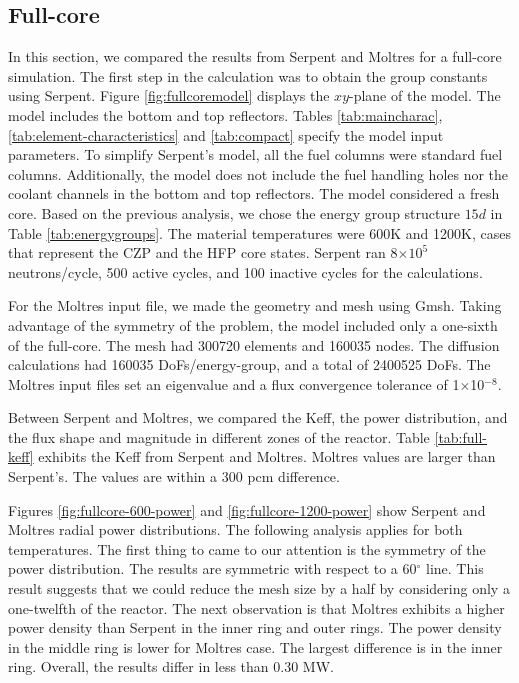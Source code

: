 \documentclass[11pt,letterpaper]{article}
\begin{document}
\subsection{Full-core}

In this section, we compared the results from Serpent and Moltres for a full-core simulation.
The first step in the calculation was to obtain the group constants using Serpent.
Figure \ref{fig:fullcoremodel} displays the $xy$-plane of the model.
The model includes the bottom and top reflectors.
Tables \ref{tab:maincharac}, \ref{tab:element-characteristics} and \ref{tab:compact} specify the model input parameters.
To simplify Serpent's model, all the fuel columns were standard fuel columns.
Additionally, the model does not include the fuel handling holes nor the coolant channels in the bottom and top reflectors.
The model considered a fresh core.
Based on the previous analysis, we chose the energy group structure $15d$ in Table \ref{tab:energygroups}.
The material temperatures were 600K and 1200K, cases that represent the \gls{CZP} and the \gls{HFP} core states.
Serpent ran 8$\times 10^5$ neutrons/cycle, 500 active cycles, and 100 inactive cycles for the calculations.

For the Moltres input file, we made the geometry and mesh using Gmsh.
Taking advantage of the symmetry of the problem, the model included only a one-sixth of the full-core.
The mesh had 300720 elements and 160035 nodes.
The diffusion calculations had 160035 \glspl{DoF}/energy-group, and a total of 2400525 DoFs.
The Moltres input files set an eigenvalue and a flux convergence tolerance of 1$\times$10$^{-8}$.

Between Serpent and Moltres, we compared the \gls{Keff}, the power distribution, and the flux shape and magnitude in different zones of the reactor.
Table \ref{tab:full-keff} exhibits the \gls{Keff} from Serpent and Moltres.
Moltres values are larger than Serpent's.
The values are within a 300 pcm difference.

Figures \ref{fig:fullcore-600-power} and \ref{fig:fullcore-1200-power} show Serpent and Moltres radial power distributions.
The following analysis applies for both temperatures.
The first thing to came to our attention is the symmetry of the power distribution.
The results are symmetric with respect to a 60$^{\circ}$ line.
This result suggests that we could reduce the mesh size by a half by considering only a one-twelfth of the reactor.
The next observation is that Moltres exhibits a higher power density than Serpent in the inner ring and outer rings.
The power density in the middle ring is lower for Moltres case.
The largest difference is in the inner ring.
Overall, the results differ in less than 0.30 MW.
\end{document}
